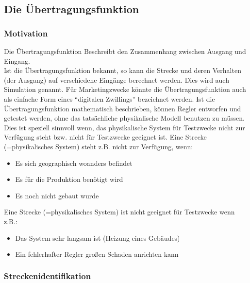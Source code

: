 \documentclass[
  letterpaper,
  DIV=11]{scrreprt}
\providecommand{\tightlist}{%
  \setlength{\itemsep}{0pt}\setlength{\parskip}{0pt}}\usepackage{longtable,booktabs,array}
\begin{document}
\subsection{Die Übertragungsfunktion}\label{die-uxfcbertragungsfunktion}

\subsubsection{Motivation}\label{motivation}

Die Übertragungsfunktion Beschreibt den Zusammenhang zwischen Ausgang
und Eingang.\\
Ist die Übertragungsfunktion bekannt, so kann die Strecke und deren
Verhalten (der Ausgang) auf verschiedene Eingänge berechnet werden. Dies
wird auch Simulation genannt. Für Marketingzwecke könnte die
Übertragungsfunktion auch als einfache Form eines ``digitalen
Zwillings'' bezeichnet werden. Ist die Übertragungsfunktion mathematisch
beschrieben, können Regler entworfen und getestet werden, ohne das
tatsächliche physikalische Modell benutzen zu müssen. Dies ist speziell
sinnvoll wenn, das physikalische System für Testzwecke nicht zur
Verfügung steht bzw. nicht für Testzwecke geeignet ist. Eine Strecke
(=physikalisches System) steht z.B. nicht zur Verfügung, wenn:

\begin{itemize}
\tightlist
\item
  Es sich geographisch woanders befindet\\
\item
  Es für die Produktion benötigt wird\\
\item
  Es noch nicht gebaut wurde
\end{itemize}

Eine Strecke (=physikalisches System) ist nicht geeignet für Testzwecke
wenn z.B.:

\begin{itemize}
\tightlist
\item
  Das System sehr langsam ist (Heizung eines Gebäudes)\\
\item
  Ein fehlerhafter Regler großen Schaden anrichten kann
\end{itemize}

\subsubsection{Streckenidentifikation}\label{sec-Streckenidentifikation}
\end{document}
